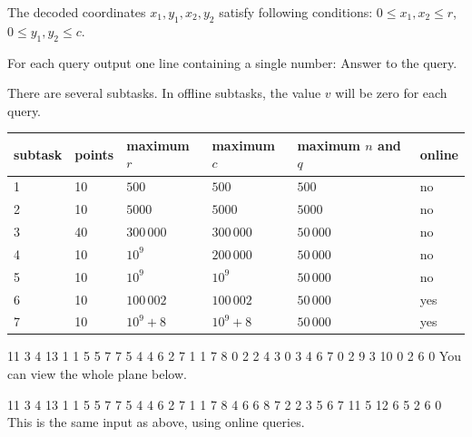 The decoded coordinates $x_1, y_1, x_2, y_2$ satisfy following conditions:
$0 \leq x_1, x_2 \leq r$, $0 \leq y_1, y_2 \leq c$. 


For each query output one line containing a single number: Answer to the query.


There are several subtasks. In offline subtasks, the value $v$ will be zero for each query. 

\bigskip

\begin{center}
\begin{tabular}{|l|l|l|l|l|l|}
\hline
subtask & points & maximum $r$  & maximum $c$   & maximum $n$ and $q$ & online    \\ \hline
1       & 10     & $500$        & $500$         & $500$     & no        \\ \hline
2       & 10     & $5000$       & $5000$        & $5000$    & no        \\ \hline
3       & 40     & $300\,000$   & $300\,000$    & $50\,000$ & no        \\ \hline
4       & 10     & $10^9$       & $200\,000$    & $50\,000$ & no        \\ \hline
5       & 10     & $10^9$       & $10^9$        & $50\,000$ & no        \\ \hline
6       & 10     & $100\,002$   & $100\,002$    & $50\,000$ & yes       \\ \hline
7       & 10     & $10^9 + 8$   & $10^9 + 8$    & $50\,000$ & yes       \\ \hline
\end{tabular}
\end{center}



 11 3 4 13
1 1 5 5
7 7 5 4
4 6 2 7
1 1 7 8 0
2 2 4 3 0
3 4 6 7 0
2 9 3 10 0
2
6
0
\sampleCOMMENT
You can view the whole plane below.
\sampleEND
{}

 11 3 4 13
1 1 5 5
7 7 5 4
4 6 2 7
1 1 7 8 4
6 6 8 7 2
2 3 5 6 7
11 5 12 6 5
2
6
0
\sampleCOMMENT
This is the same input as above, using online queries.
\sampleEND

